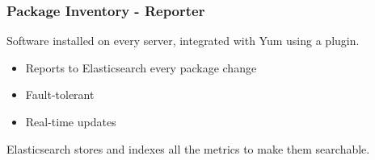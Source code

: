 \documentclass[aspectratio=169]{beamer}
\begin{document}

\begin{frame}
    \frametitle{Package Inventory - Reporter}

    Software installed on every server, integrated with Yum using a plugin.

    \begin{itemize}
        \item Reports to Elasticsearch every package change
        \item Fault-tolerant
        \item Real-time updates
    \end{itemize}

    Elasticsearch stores and indexes all the metrics to make them searchable.

    \begin{center}
        \vspace{10px}
    \end{center}
\end{frame}

\end{document}

